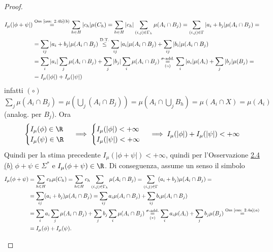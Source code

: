 \begin{proof}
\begin{enumerate}
\begin{itemize}
            \[\begin{aligned}
                I_\mu(|\phi+\psi|) & \overset{\text{Oss \ref{oss: 2.4b}}(b)}{=} \sum_{h\in H}|c_h|\mu(C_h) = \sum_{h\in H}|c_h|\sum _{(i,j)\in \Gamma_h}\mu(A_i\cap B_j) = \sum_{(i,j)\in \Gamma}|a_i+b_j|\mu(A_i\cap B_j)= \\
                 & = \sum_{ij}|a_i+b_j|\mu(A_i\cap B_j)\overset{\text{D.T.}}\leq \sum_{ij}|a_i|\mu(A_i\cap B_j)+ \sum_{ij}|b_i|\mu(A_i\cap B_j) \\
                  &= \sum_{i}|a_i|\sum_j\mu(A_i\cap B_j)+\sum_{j}|b_j|\sum_i\mu(A_i\cap B_j) \underset{(\circ)}{\overset{\sigma\text{-add.}}{=}} \sum_i|a_i|\mu(A_i) + \sum_j|b_j|\mu(B_j) = \\
                    & = I_\mu(|\phi|)+I_\mu(|\psi|)
            \end{aligned}\]
            infatti $(\circ)$ $\sum_j\mu(A_i\cap B_j)=\mu(\bigcup_j(A_i\cap B_j)) = \mu (A_i\cap \bigcup_jB_h) = \mu(A_i\cap X)=\mu(A_i)$ (analog. per $B_j$). Ora 
            \[\begin{cases}
                I_\mu(\phi)\in \R\\
                I_\mu(\psi)\in \R
            \end{cases}\implies \begin{cases}
                I_\mu(|\phi|)<+\infty\\
                I_\mu(|\psi|)<+\infty
            \end{cases}\implies I_\mu(|\phi|)+I_\mu(|\psi|)<+\infty\]
            Quindi per la stima precedente $I_\mu(|\phi+\psi|)<+\infty$, quindi per l'Osservazione \hyperref[oss: 2.4b]{2.4 ($b$)} $\phi+\psi\in \Sigma^*$ e $I_\mu(\phi+\psi)\in \R$. Di conseguenza, assume un senso il simbolo
            \[\begin{aligned}
                I_\mu(\phi+\psi) & = \sum_{h\in H}c_h\mu(C_h) = \sum_{h\in H}c_h\sum _{(i,j)\in \Gamma_h}\mu(A_i\cap B_j) = \sum_{(i,j)\in \Gamma}(a_i+b_j)\mu(A_i\cap B_j)= \\
                 & = \sum_{ij}(a_i+b_j)\mu(A_i\cap B_j) = \sum_{ij}a_i\mu(A_i\cap B_j)+ \sum_{ij}b_i\mu(A_i\cap B_j) \\
                  &= \sum_{i}a_i\sum_j\mu(A_i\cap B_j)+\sum_{j}b_j\sum_i\mu(A_i\cap B_j) \underset{(*)}{\overset{\sigma\text{-add.}}{=}} \sum_ia_i\mu(A_i) + \sum_jb_j\mu(B_j) \overset{\text{Oss \ref{oss: 2.4a}}(a)}= \\
                    & = I_\mu(\phi)+I_\mu(\psi).
            \end{aligned}\]

\end{itemize}
\end{enumerate}
\end{proof}
